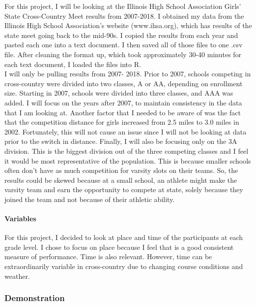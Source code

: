 \documentclass[
]{article}
\begin{document}
For this project, I will be looking at the Illinois High School
Association Girls' State Cross-Country Meet results from 2007-2018. I
obtained my data from the Illinois High School Association's website
(www.ihsa.org), which has results of the state meet going back to the
mid-90s. I copied the results from each year and pasted each one into a
text document. I then saved all of those files to one .csv file. After
cleaning the format up, which took approximately 30-40 minutes for each
text document, I loaded the files into R.\\
I will only be pulling results from 2007- 2018. Prior to 2007, schools
competing in cross-country were divided into two classes, A or AA,
depending on enrollment size. Starting in 2007, schools were divided
into three classes, and AAA was added. I will focus on the years after
2007, to maintain consistency in the data that I am looking at. Another
factor that I needed to be aware of was the fact that the competition
distance for girls increased from 2.5 miles to 3.0 miles in 2002.
Fortunately, this will not cause an issue since I will not be looking at
data prior to the switch in distance. Finally, I will also be focusing
only on the 3A division. This is the biggest division out of the three
competing classes and I feel it would be most representative of the
population. This is because smaller schools often don't have as much
competition for varsity slots on their teams. So, the results could be
skewed because at a small school, an athlete might make the varsity team
and earn the opportunity to compete at state, solely because they joined
the team and not because of their athletic ability.

\hypertarget{variables}{%
\paragraph{Variables}\label{variables}}

For this project, I decided to look at place and time of the
participants at each grade level. I chose to focus on place because I
feel that is a good consistent measure of performance. Time is also
relevant. However, time can be extraordinarily variable in cross-country
due to changing course conditions and weather.

\hypertarget{demonstration}{%
\subsubsection{Demonstration}\label{demonstration}}
\end{document}
